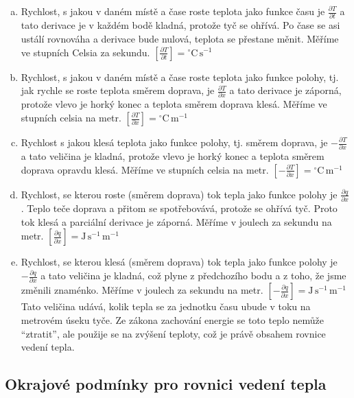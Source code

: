 \reseni
\begin{enumerate}[a)]
\item Rychlost, s jakou v daném místě a čase roste teplota jako funkce času je $\frac {\partial T}{\partial t}$ a tato derivace je v každém bodě kladná, protože tyč se ohřívá. Po čase se asi ustálí rovnováha a derivace bude nulová, teplota se přestane měnit. Měříme ve stupních Celsia za sekundu.
  $\left[\frac {\partial T}{\partial t}\right]={}^\circ\mathrm{C}\,\mathrm{s}^{-1}$
\item Rychlost, s jakou v daném místě a čase roste teplota jako funkce polohy, tj. jak rychle se roste teplota směrem doprava, je $\frac {\partial T}{\partial x}$ a tato derivace je záporná, protože vlevo je horký konec a teplota směrem doprava klesá. Měříme ve stupních celsia na metr.
    $\left[\frac {\partial T}{\partial x}\right]={}^\circ\mathrm{C}\,\mathrm{m}^{-1}$
  \item Rychlost s jakou klesá teplota jako funkce polohy, tj. směrem doprava, je $-\frac {\partial T}{\partial x}$ a tato veličina je kladná, protože vlevo je horký konec a teplota směrem doprava opravdu klesá. Měříme ve stupních celsia na metr.
        $\left[-\frac {\partial T}{\partial x}\right]={}^\circ\mathrm{C}\,\mathrm{m}^{-1}$

\item Rychlost, se kterou roste (směrem doprava) tok tepla jako funkce polohy je $\frac {\partial q}{\partial x}$. Teplo teče doprava a přitom se spotřebovává, protože se ohřívá tyč. Proto tok klesá a parciální derivace je záporná.
  Měříme v joulech za sekundu na metr.
          $\left[\frac {\partial q}{\partial x}\right]=\mathrm{J}\,\mathrm{s}^{-1}\,\mathrm{m}^{-1}$
\item Rychlost, se kterou klesá (směrem doprava) tok tepla jako funkce polohy je $-\frac {\partial q}{\partial x}$ a tato veličina je kladná, což plyne z předchozího bodu a z toho, že jsme změnili znaménko.
  Měříme v joulech za sekundu na metr.
            $\left[-\frac {\partial q}{\partial x}\right]=\mathrm{J}\,\mathrm{s}^{-1}\,\mathrm{m}^{-1}$ Tato veličina udává, kolik tepla se za jednotku času ubude v toku na metrovém úseku tyče. Ze zákona zachování energie se toto teplo nemůže ``ztratit'', ale použije se na zvýšení teploty, což je právě obsahem rovnice vedení tepla.
\end{enumerate}

\konec




\subsection{Okrajové podmínky pro rovnici vedení tepla}

